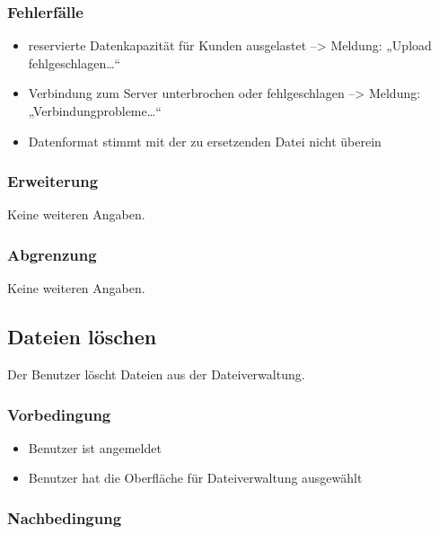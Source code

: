 \documentclass[a4paper,12pt]{article}
\begin{document}
\subsubsection{Fehlerfälle}\label{fehlerfalle-12}

\begin{itemize}

\item
  reservierte Datenkapazität für Kunden ausgelastet --\textgreater{}
  Meldung: „Upload fehlgeschlagen\ldots{}``
\item
  Verbindung zum Server unterbrochen oder fehlgeschlagen
  --\textgreater{} Meldung: „Verbindungprobleme\ldots{}``
\item
  Datenformat stimmt mit der zu ersetzenden Datei nicht überein
\end{itemize}

\subsubsection{Erweiterung}\label{erweiterung-12}
Keine weiteren Angaben.

\subsubsection{Abgrenzung}\label{abgrenzung-12}
Keine weiteren Angaben.

\clearpage

\subsection{Dateien löschen}\label{dateien-loschen-produkt-kunden--bilderpdfs}
Der Benutzer löscht Dateien aus der Dateiverwaltung.

\subsubsection{Vorbedingung}\label{vorbedingung-13}

\begin{itemize}

\item
  Benutzer ist angemeldet
\item
  Benutzer hat die Oberfläche für Dateiverwaltung ausgewählt
\end{itemize}

\subsubsection{Nachbedingung}\label{nachbedingung-13}
\end{document}
